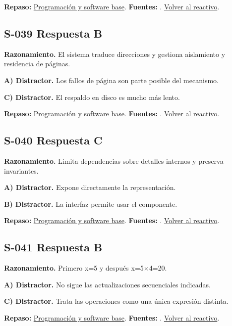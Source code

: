 \textbf{Repaso:} \hyperref[sec:s2]{Programación y software base}. \textbf{Fuentes:} \cite{ostep,cppreference,compiler}. \hyperref[q:S-038]{Volver al reactivo}.\par\medskip

\subsection*{S-039 \quad Respuesta B}\label{s:S-039}
\textbf{Razonamiento.} El sistema traduce direcciones y gestiona aislamiento y residencia de páginas.

\textbf{A) Distractor. }Los fallos de página son parte posible del mecanismo.

\textbf{C) Distractor. }El respaldo en disco es mucho más lento.

\textbf{Repaso:} \hyperref[sec:s2]{Programación y software base}. \textbf{Fuentes:} \cite{ostep,cppreference,compiler}. \hyperref[q:S-039]{Volver al reactivo}.\par\medskip

\subsection*{S-040 \quad Respuesta C}\label{s:S-040}
\textbf{Razonamiento.} Limita dependencias sobre detalles internos y preserva invariantes.

\textbf{A) Distractor. }Expone directamente la representación.

\textbf{B) Distractor. }La interfaz permite usar el componente.

\textbf{Repaso:} \hyperref[sec:s2]{Programación y software base}. \textbf{Fuentes:} \cite{ostep,cppreference,compiler}. \hyperref[q:S-040]{Volver al reactivo}.\par\medskip

\subsection*{S-041 \quad Respuesta B}\label{s:S-041}
\textbf{Razonamiento.} Primero x=5 y después x=5×4=20.

\textbf{A) Distractor. }No sigue las actualizaciones secuenciales indicadas.

\textbf{C) Distractor. }Trata las operaciones como una única expresión distinta.

\textbf{Repaso:} \hyperref[sec:s2]{Programación y software base}. \textbf{Fuentes:} \cite{ostep,cppreference,compiler}. \hyperref[q:S-041]{Volver al reactivo}.\par\medskip


